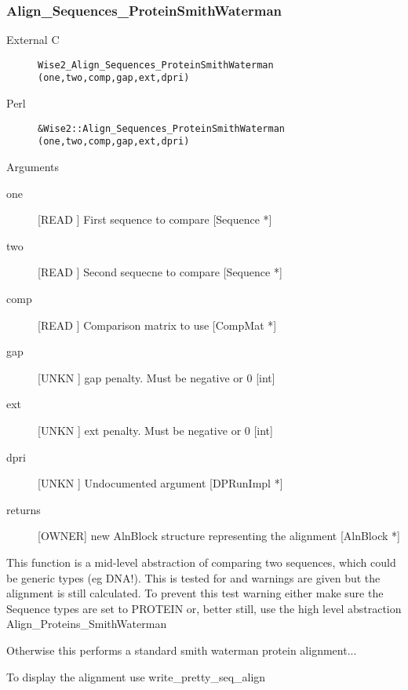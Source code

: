 \subsubsection{Align_Sequences_ProteinSmithWaterman}
\begin{description}
\item[External C] {\tt Wise2_Align_Sequences_ProteinSmithWaterman (one,two,comp,gap,ext,dpri)}
\item[Perl] {\tt &Wise2::Align_Sequences_ProteinSmithWaterman (one,two,comp,gap,ext,dpri)}

\end{description}
Arguments
\begin{description}
\item[one] [READ ] First sequence to compare [Sequence *]
\item[two] [READ ] Second sequecne to compare [Sequence *]
\item[comp] [READ ] Comparison matrix to use [CompMat *]
\item[gap] [UNKN ] gap penalty. Must be negative or 0 [int]
\item[ext] [UNKN ] ext penalty. Must be negative or 0 [int]
\item[dpri] [UNKN ] Undocumented argument [DPRunImpl *]
\item[returns] [OWNER] new AlnBlock structure representing the alignment [AlnBlock *]
\end{description}
This function is a mid-level abstraction of
comparing two sequences, which could be
generic types (eg DNA!). This is tested
for and warnings are given but the alignment
is still calculated. To prevent this test
warning either make sure the Sequence types
are set to PROTEIN or, better still, use the
high level abstraction Align_Proteins_SmithWaterman


Otherwise this performs a standard smith waterman
protein alignment...


To display the alignment use  write_pretty_seq_align


